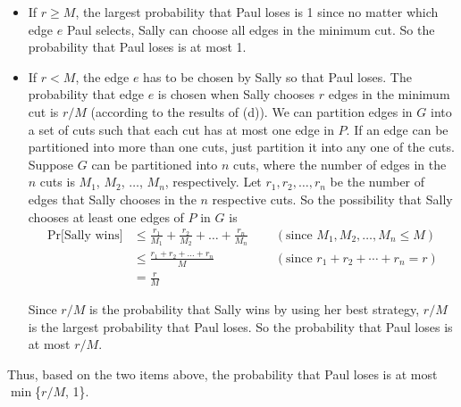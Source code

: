 \documentclass[letterpaper,11pt]{article}
\begin{document}
\begin{enumerate}
\begin{enumerate}
\begin{solution}
\begin{itemize}
\item If $r \ge M$, the largest probability that Paul loses is 1 since no
  matter which edge $e$ Paul selects, Sally can choose all edges in the minimum
  cut. So the probability that Paul loses is at most 1.
\item If $r < M$, the edge $e$ has to be chosen by Sally so that Paul loses.
  The probability that edge $e$ is chosen when Sally chooses $r$ edges in the
  minimum cut is $r/M$ (according to the results of (d)). We can partition
  edges in $G$ into a set of cuts such that each cut has at most one edge in
  $P$. If an edge can be partitioned into more
  than one cuts, just partition it into any one of the cuts. Suppose $G$ can be
  partitioned into $n$ cuts, where the number of edges in the $n$ cuts is
  $M_1$, $M_2$, $\dots$, $M_n$, respectively. Let $r_1, r_2, \dots, r_n$ be the
  number of edges that Sally chooses in the $n$ respective cuts. So the
  possibility that Sally chooses at least one edges of $P$ in $G$ is
\begin{align*}
\textrm{Pr[Sally wins]} &\le \frac{r_1}{M_1} + \frac{r_2}{M_2} + \dots +
\frac{r_n}{M_n}
~~~~~~&(\mbox{since $M_1, M_2, \dots, M_n \le M$}) \\
&\le \frac{r_1 + r_2 + \dots + r_n}{M} 
~~~~~~&(\mbox{since $r_1 + r_2 + \cdots + r_n = r$}) \\
&= \frac{r}{M}
\end{align*}

Since $r/M$ is the probability that Sally wins by using her best strategy,
$r/M$ is the largest probability that Paul loses. So the probability that Paul
loses is at most $r/M$.
\end{itemize}
Thus, based on the two items above, the probability that Paul loses is at most
$\min$\{$r/M$, 1\}.

    \end{solution}

\end{enumerate}


\end{enumerate}
\end{document}
